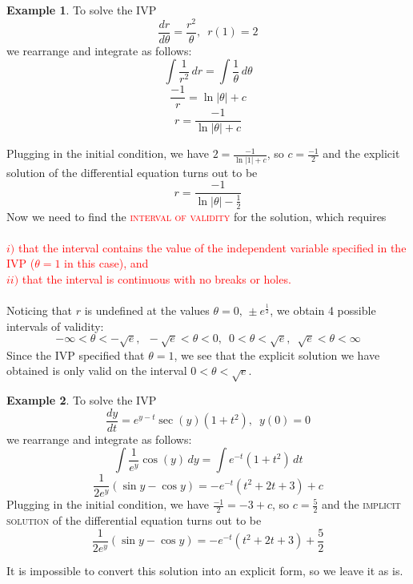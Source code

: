 \documentclass[11pt]{article}
\theoremstyle{definition}
\newtheorem{ex}{Example}
\begin{document}
\begin{ex}
    To solve the IVP \begin{equation}
        \frac{dr}{d\theta} = \frac{r^2}{\theta},\,\,\, r(1) = 2
    \end{equation}we rearrange and integrate as follows: \begin{equation}
        \int\frac{1}{r^2}\,dr = \int\frac{1}{\theta}\,d\theta
    \end{equation}
    \begin{equation}
        \frac{-1}{r} = \ln{|\theta|} + c
    \end{equation}
    \begin{equation}
        r = \frac{-1}{\ln{|\theta|} + c}
    \end{equation}
\end{ex}
Plugging in the initial condition, we have $2 = \frac{-1}{\ln{|1|} + c}$, so $c = \frac{-1}{2}$ and the explicit solution of the differential equation turns out to be \begin{equation}
    r = \frac{-1}{\ln{|\theta|} - \frac{1}{2}}
\end{equation} Now we need to find the \textcolor{red}{\textsc{interval of validity}} for the solution, which requires\\\\ \textcolor{red}{$i)$ that the interval contains the value of the independent variable specified in the IVP ($\theta = 1$ in this case), and\\ $ii)$ that the interval is continuous with no breaks or holes.}\\\\ Noticing that $r$ is undefined at the values $\theta = 0, \,\pm{e^{\frac{1}{2}}}$, we obtain 4 possible intervals of validity: \begin{equation}
    -\infty < \theta < -\sqrt{e},\,\,\, -\sqrt{e} < \theta < 0,\,\,\, 0 < \theta < \sqrt{e},\,\,\, \sqrt{e} < \theta < \infty
\end{equation} Since the IVP specified that $\theta = 1$, we see that the explicit solution we have obtained is only valid on the interval $0 < \theta < \sqrt{e}$.
\begin{ex}
    To solve the IVP \begin{equation}
        \frac{dy}{dt} = e^{y - t}\sec{(y)}(1 + t^2),\,\,\, y(0) = 0
    \end{equation} we rearrange and integrate as follows:\begin{equation}
        \int \frac{1}{e^y}\cos(y)\,dy = \int e^{-t}(1 + t^2)\,dt
    \end{equation}
    \begin{equation}
        \frac{1}{2e^y}(\sin{y} - \cos{y}) = -e^{-t}(t^2 + 2t + 3) + c
    \end{equation} Plugging in the initial condition, we have $\frac{-1}{2} = -3 + c$, so $c = \frac{5}{2}$ and the \textsc{implicit solution} of the differential equation turns out to be \begin{equation}
        \frac{1}{2e^y}(\sin{y} - \cos{y}) = -e^{-t}(t^2 + 2t + 3) + \frac{5}{2}
    \end{equation}
\end{ex} It is impossible to convert this solution into an explicit form, so we leave it as is.
\end{document}
